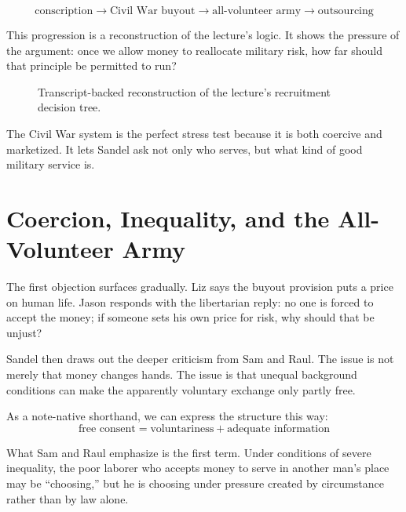 \begin{equation}
\text{conscription}
\to
\text{Civil War buyout}
\to
\text{all-volunteer army}
\to
\text{outsourcing}
\end{equation}

This progression is a reconstruction of the lecture's logic. It shows the pressure of the argument: once we allow money to reallocate military risk, how far should that principle be permitted to run?

\begin{figure}[h]
\centering
{}
\caption{Transcript-backed reconstruction of the lecture's recruitment decision tree.}
\end{figure}

The Civil War system is the perfect stress test because it is both coercive and marketized. It lets Sandel ask not only who serves, but what kind of good military service is.

\section{Coercion, Inequality, and the All-Volunteer Army}

The first objection surfaces gradually. Liz says the buyout provision puts a price on human life. Jason responds with the libertarian reply: no one is forced to accept the money; if someone sets his own price for risk, why should that be unjust?

Sandel then draws out the deeper criticism from Sam and Raul. The issue is not merely that money changes hands. The issue is that unequal background conditions can make the apparently voluntary exchange only partly free.

As a note-native shorthand, we can express the structure this way:
\begin{equation}
\text{free consent} = \text{voluntariness} + \text{adequate information}
\end{equation}

What Sam and Raul emphasize is the first term. Under conditions of severe inequality, the poor laborer who accepts money to serve in another man's place may be ``choosing,'' but he is choosing under pressure created by circumstance rather than by law alone.

